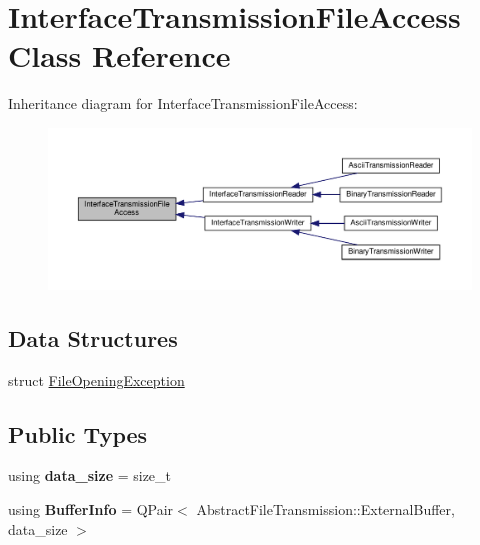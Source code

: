 \hypertarget{classInterfaceTransmissionFileAccess}{}\section{Interface\+Transmission\+File\+Access Class Reference}
\label{classInterfaceTransmissionFileAccess}


Inheritance diagram for Interface\+Transmission\+File\+Access\+:\nopagebreak
\begin{figure}[H]
\begin{center}
\leavevmode
\includegraphics[width=350pt]{d1/dd6/classInterfaceTransmissionFileAccess__inherit__graph}
\end{center}
\end{figure}
\subsection*{Data Structures}
\begin{DoxyCompactItemize}
\item 
struct \hyperlink{structInterfaceTransmissionFileAccess_1_1FileOpeningException}{File\+Opening\+Exception}
\end{DoxyCompactItemize}
\subsection*{Public Types}
\begin{DoxyCompactItemize}
\item 
\mbox{\label{classInterfaceTransmissionFileAccess_ad55c52a834e6c0832685a5a351ee705d}} 
using {\bfseries data\+\_\+size} = size\+\_\+t
\item 
\mbox{\label{classInterfaceTransmissionFileAccess_ad01badb0873f5db255889ad20115f5c3}} 
using {\bfseries Buffer\+Info} = Q\+Pair$<$ Abstract\+File\+Transmission\+::\+External\+Buffer, data\+\_\+size $>$
\end{DoxyCompactItemize}
